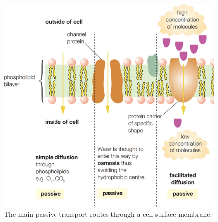 \begin{figure}[H]
    \centering
    \includegraphics[scale=0.125]{Biology/2A/Images/2A-2-3.png}
    \caption{The main passive transport routes through a cell surface membrane.} 
\end{figure}

